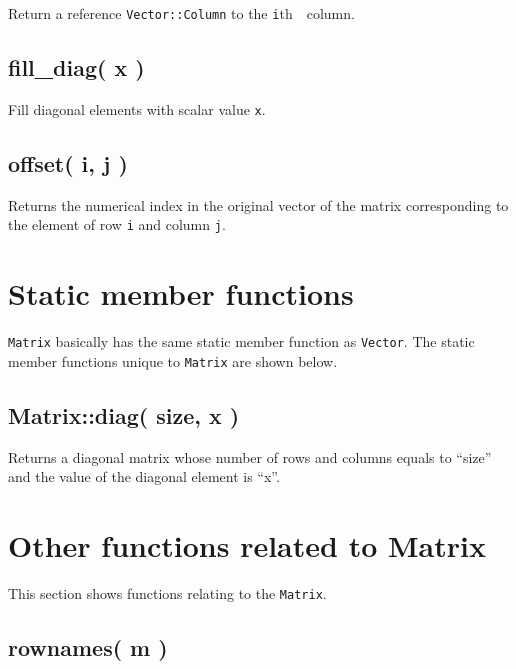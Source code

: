 \documentclass[]{book}
\begin{document}
Return a reference \texttt{Vector::Column} to the \texttt{i}th　column.

\hypertarget{fill_diag-x}{%
\subsection{fill\_diag( x )}\label{fill_diag-x}}

Fill diagonal elements with scalar value \texttt{x}.

\hypertarget{offset-i-j}{%
\subsection{offset( i, j )}\label{offset-i-j}}

Returns the numerical index in the original vector of the matrix corresponding to the element of row \texttt{i} and column \texttt{j}.

\hypertarget{static-member-functions-1}{%
\section{Static member functions}\label{static-member-functions-1}}

\texttt{Matrix} basically has the same static member function as \texttt{Vector}. The static member functions unique to \texttt{Matrix} are shown below.

\hypertarget{matrixdiag-size-x}{%
\subsection{Matrix::diag( size, x )}\label{matrixdiag-size-x}}

Returns a diagonal matrix whose number of rows and columns equals to ``size'' and the value of the diagonal element is ``x''.

\hypertarget{other-functions-related-to-matrix}{%
\section{Other functions related to Matrix}\label{other-functions-related-to-matrix}}

This section shows functions relating to the \texttt{Matrix}.

\hypertarget{rownames-m}{%
\subsection{rownames( m )}\label{rownames-m}}
\end{document}
